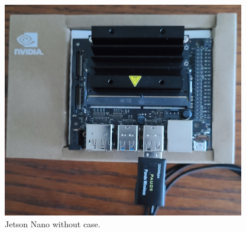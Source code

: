 \begin{figure}[H]
	\begin{center}
		\includegraphics[scale=0.9]{diagram-jetson-nano-02}
		
		
	\end{center}
	\caption[Jetson Nano]{Jetson Nano without case.}
	
	
\end{figure}